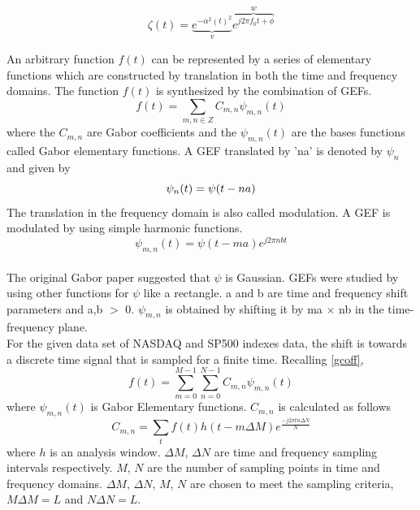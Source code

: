 \begin{equation}
\zeta(t) = \underbrace{e^{-\alpha ^2(t)^2}}_v\overbrace{e^{j2\pi f_0 t+\phi}}^w
\end{equation}

An arbitrary function $f(t)$ can be represented by a series of elementary functions which are constructed by translation in both the time and frequency domains. The function $f(t)$ is synthesized by the combination of GEFs.\\

\begin{equation}\label{gcoff}
f(t) = \sum_{m,n\in Z} C_{m,n} \psi_{m,n}(t)
\end{equation}
where the $C_{m,n}$ are Gabor coefficients and the $\psi_{m,n}(t)$ are the bases functions called Gabor elementary functions. A GEF translated by 'na' is denoted by $\psi_n$ and given by
\begin{equation*}
\psi_{n}(t) = \psi(t-na)\\
\end{equation*}
The translation in the frequency domain is also called modulation. A GEF is modulated by using simple harmonic functions. 
\begin{equation*}
\psi_{m,n}(t) = \psi(t-ma) e^{j2\pi nbt}
\end{equation*}\\
The original Gabor paper suggested that $\psi$ is Gaussian. GEFs were studied by using other functions for $\psi$ like a rectangle.  a and b are time and frequency shift parameters and a,b $>$  0. $\psi_{m,n}$ is obtained by shifting it by  ma $\times$ nb in the time-frequency plane.\\

For the given data set of NASDAQ and SP500 indexes data, the shift is towards a discrete time signal that is sampled for a finite time. Recalling \ref{gcoff}, 
\begin{equation}\label{gcoff1}
f(t) = \sum_{m=0}^{M-1}\sum_{n=0}^{N-1} C_{m,n} \psi_{m,n}(t)
\end{equation}
where $\psi_{m,n}(t)$ is Gabor Elementary functions.
$C_{m,n}$ is calculated as follows
\begin{equation}\label{cmn}
C_{m,n}  = \sum_t f(t) h(t-m\Delta M) e^\frac{-j2\pi t n\Delta N}{N}
\end{equation}
where $h$ is an analysis window.
$\Delta M$, $\Delta N$ are time and frequency sampling intervals respectively. $M$, $N$ are the number of sampling points in time and frequency domains. $\Delta M$, $\Delta N$, $M$, $N$ are chosen to meet the sampling criteria, $M\Delta M = L$ and $N\Delta N = L$. 


